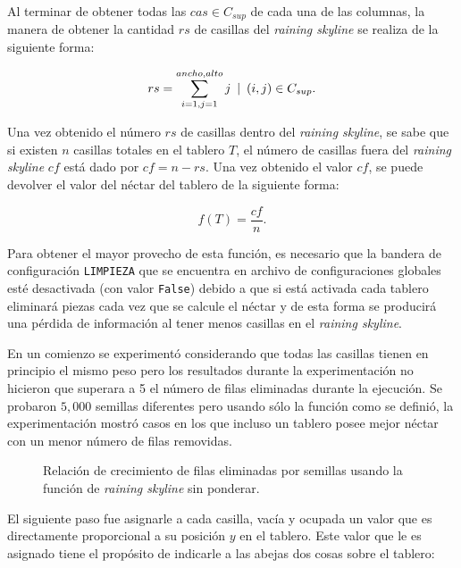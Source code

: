 Al terminar de obtener todas las $cas \in C_{sup}$ de cada una de las columnas, la manera 
de obtener la cantidad $rs$ de casillas del \emph{raining skyline} se realiza de la siguiente forma:

\begin{displaymath}
  rs = \sum_{i=1,j=1}^{ancho, alto} j \enskip | \enskip (i,j) \in C_{sup}.
\end{displaymath} 
 
Una vez obtenido el número $rs$ de casillas dentro del \emph{raining skyline}, se sabe que si 
existen $n$ casillas totales en el tablero $T$, el número de casillas 
fuera del \emph{raining skyline} $cf$ está dado por $cf = n - rs$. Una vez obtenido el 
valor $cf$, se puede devolver el valor del néctar del tablero de la siguiente forma: 

\begin{displaymath}
  f(T) = \frac{cf}{n}.
\end{displaymath} 

Para obtener el mayor provecho de esta función, es necesario que la bandera de 
configuración \texttt{LIMPIEZA} que se encuentra en archivo de configuraciones 
globales esté desactivada (con valor \texttt{False}) debido a que si está activada 
cada tablero eliminará piezas cada vez que se calcule el néctar y de esta forma se 
producirá una pérdida de información al tener menos casillas en el \emph{raining skyline}.




En un comienzo se experimentó considerando que todas las casillas 
tienen en principio el mismo peso pero los resultados durante la experimentación 
no hicieron que superara a 5 el número de filas eliminadas durante la ejecución.
Se probaron $5,000$ semillas diferentes pero usando sólo la función como se  
definió, la experimentación mostró casos en los que incluso un tablero posee mejor 
néctar con un menor número de filas removidas.

\begin{figure}[h]

\caption[short caption]{Relación de crecimiento de filas eliminadas por semillas usando 
la función de \emph{raining skyline} sin ponderar.}
\label{fig:rainingskyline}
\end{figure}

El siguiente paso fue asignarle a cada casilla, vacía y ocupada un valor que es 
directamente proporcional a su posición $y$ en el tablero. Este valor que le es 
asignado tiene el propósito de indicarle a las abejas dos cosas sobre el tablero:

